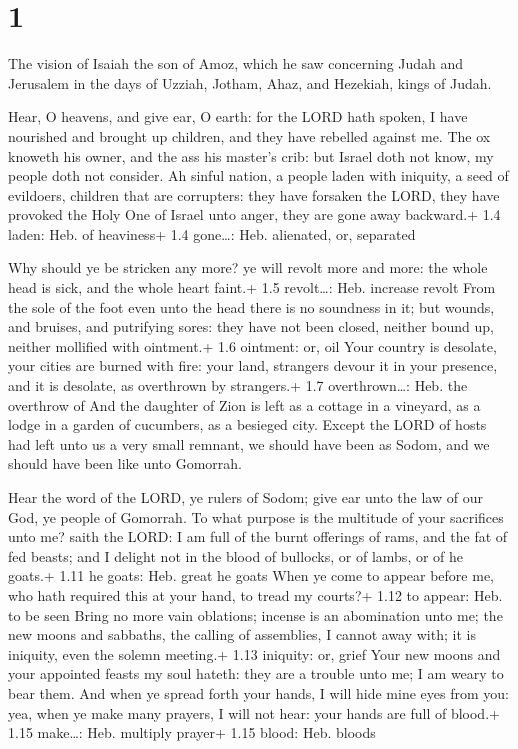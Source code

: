\hypertarget{section}{%
\section{1}\label{section}}

 The vision of Isaiah the son of Amoz, which he saw
concerning Judah and Jerusalem in the days of Uzziah, Jotham, Ahaz, and
Hezekiah, kings of Judah.

 Hear, O heavens, and give ear, O earth: for the LORD hath
spoken, I have nourished and brought up children, and they have rebelled
against me.  The ox knoweth his owner, and the ass his
master's crib: but Israel doth not know, my people doth not consider.
 Ah sinful nation, a people laden with iniquity, a seed of
evildoers, children that are corrupters: they have forsaken the LORD,
they have provoked the Holy One of Israel unto anger, they are gone away
backward.+ 1.4 laden: Heb. of heaviness+ 1.4 gone\ldots: Heb. alienated,
or, separated

 Why should ye be stricken any more? ye will revolt more
and more: the whole head is sick, and the whole heart faint.+ 1.5
revolt\ldots: Heb. increase revolt  From the sole of the
foot even unto the head there is no soundness in it; but wounds, and
bruises, and putrifying sores: they have not been closed, neither bound
up, neither mollified with ointment.+ 1.6 ointment: or, oil 
Your country is desolate, your cities are burned with fire: your land,
strangers devour it in your presence, and it is desolate, as overthrown
by strangers.+ 1.7 overthrown\ldots: Heb. the overthrow of 
And the daughter of Zion is left as a cottage in a vineyard, as a lodge
in a garden of cucumbers, as a besieged city.  Except the
LORD of hosts had left unto us a very small remnant, we should have been
as Sodom, and we should have been like unto Gomorrah.

 Hear the word of the LORD, ye rulers of Sodom; give ear
unto the law of our God, ye people of Gomorrah.  To what
purpose is the multitude of your sacrifices unto me? saith the LORD: I
am full of the burnt offerings of rams, and the fat of fed beasts; and I
delight not in the blood of bullocks, or of lambs, or of he goats.+ 1.11
he goats: Heb. great he goats  When ye come to appear
before me, who hath required this at your hand, to tread my courts?+
1.12 to appear: Heb. to be seen  Bring no more vain
oblations; incense is an abomination unto me; the new moons and
sabbaths, the calling of assemblies, I cannot away with; it is iniquity,
even the solemn meeting.+ 1.13 iniquity: or, grief  Your
new moons and your appointed feasts my soul hateth: they are a trouble
unto me; I am weary to bear them.  And when ye spread forth
your hands, I will hide mine eyes from you: yea, when ye make many
prayers, I will not hear: your hands are full of blood.+ 1.15
make\ldots: Heb. multiply prayer+ 1.15 blood: Heb. bloods

